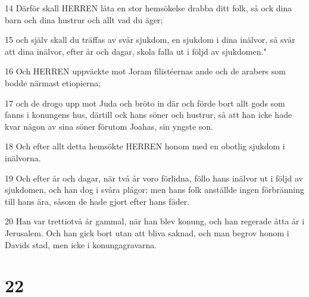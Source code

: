 \par 14 Därför skall HERREN låta en stor hemsökelse drabba ditt folk, så ock dina barn och dina hustrur och allt vad du äger;
\par 15 och själv skall du träffas av svår sjukdom, en sjukdom i dina inälvor, så svår att dina inälvor, efter år och dagar, skola falla ut i följd av sjukdomen."
\par 16 Och HERREN uppväckte mot Joram filistéernas ande och de arabers som bodde närmast etiopierna;
\par 17 och de drogo upp mot Juda och bröto in där och förde bort allt gods som fanns i konungens hus, därtill ock hans söner och hustrur, så att han icke hade kvar någon av sina söner förutom Joahas, sin yngste son.
\par 18 Och efter allt detta hemsökte HERREN honom med en obotlig sjukdom i inälvorna.
\par 19 Och efter år och dagar, när två år voro förlidna, föllo hans inälvor ut i följd av sjukdomen, och han dog i svåra plågor; men hans folk anställde ingen förbränning till hans ära, såsom de hade gjort efter hans fäder.
\par 20 Han var trettiotvå år gammal, när han blev konung, och han regerade åtta år i Jerusalem. Och han gick bort utan att bliva saknad, och man begrov honom i Davids stad, men icke i konungagravarna.

\chapter{22}

